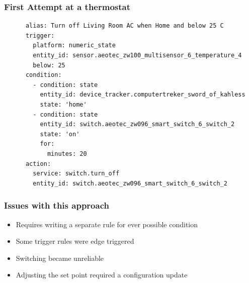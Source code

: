 \documentclass[aspectratio=169,11pt,hyperref={colorlinks=true}]{beamer}
\begin{document}
\begin{frame}[fragile=singleslide]
    \frametitle{First Attempt at a thermostat}
    \begin{verbatim}
      alias: Turn off Living Room AC when Home and below 25 C
      trigger:
        platform: numeric_state
        entity_id: sensor.aeotec_zw100_multisensor_6_temperature_4
        below: 25
      condition:
        - condition: state
          entity_id: device_tracker.computertreker_sword_of_kahless
          state: 'home'
        - condition: state
          entity_id: switch.aeotec_zw096_smart_switch_6_switch_2
          state: 'on'
          for:
            minutes: 20
      action:
        service: switch.turn_off
        entity_id: switch.aeotec_zw096_smart_switch_6_switch_2
    \end{verbatim}
\end{frame}

\begin{frame}
    \frametitle{Issues with this approach}
    \begin{itemize}
        \item Requires writing a separate rule for ever possible condition
        \item Some trigger rules were edge triggered
        \item Switching became unreliable
        \item Adjusting the set point required a configuration update
    \end{itemize}
\end{frame}
\end{document}
